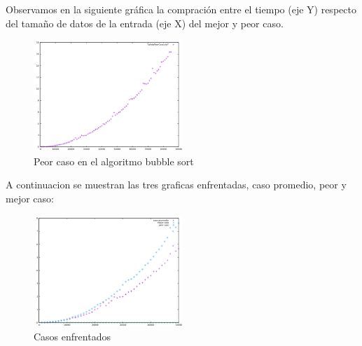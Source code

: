 Observamos en la siguiente gráfica la compración entre el tiempo (eje Y) respecto del tamaño de datos de la entrada (eje X) del mejor y peor caso.

\begin{figure}[ht]
  \centering
  \includegraphics[width=0.5\textwidth]{./Imagenes/peorCaso.png}
  \caption{Peor caso en el algoritmo bubble sort}
\end{figure}


A continuacion se muestran las tres graficas enfrentadas, caso promedio, peor y mejor caso:

\begin{figure}[ht]
  \centering
  \includegraphics[width=0.5\textwidth]{./Imagenes/casosEnfrentados.png}
  \caption{Casos enfrentados}
\end{figure}
